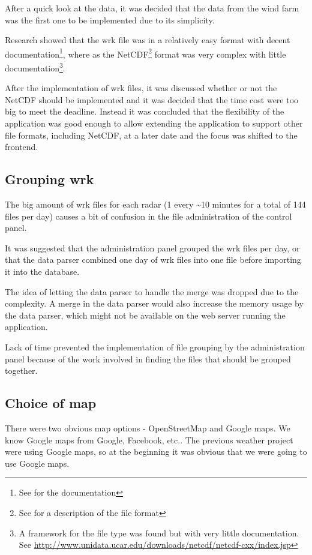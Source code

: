 After a quick look at the data, it was decided that the data from the wind farm was the first one to be implemented due to its simplicity.

Research showed that the wrk file was in a relatively easy format with decent documentation\footnote{See \cite{VRIS} for the documentation}, where as the NetCDF\footnote{See \cite{NetCDF} for a description of the file format} format was very complex with little documentation\footnote{A framework for the file type was found but with very little documentation. See \url{http://www.unidata.ucar.edu/downloads/netcdf/netcdf-cxx/index.jsp}}.

After the implementation of wrk files, it was discussed whether or not the NetCDF should be implemented and it was decided that the time cost were too big to meet the deadline. Instead it was concluded that the flexibility of the application was good enough to allow extending the application to support other file formats, including NetCDF, at a later date and the focus was shifted to the frontend.

\subsection{Grouping wrk}
The big amount of wrk files for each radar (1 every \textasciitilde 10 minutes for a total of 144 files per day) causes a bit of confusion in the file administration of the control panel.

It was suggested that the administration panel grouped the wrk files per day, or that the data parser combined one day of wrk files into one file before importing it into the database.

The idea of letting the data parser to handle the merge was dropped due to the complexity. A merge in the data parser would also increase the memory usage by the data parser, which might not be available on the web server running the application.

Lack of time prevented the implementation of file grouping by the administration panel because of the work involved in finding the files that should be grouped together.

\subsection{Choice of map}
There were two obvious map options - OpenStreetMap and Google maps. We know Google maps from Google, Facebook, etc.. The previous weather project were using Google maps, so at the beginning it was obvious that we were going to use Google maps.

